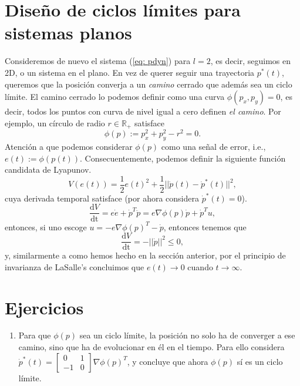 	\section{Diseño de ciclos límites para sistemas planos}
	Consideremos de nuevo el sistema (\ref{eq: pdyn}) para $l=2$, es decir, seguimos en 2D, o un sistema en el plano. En vez de querer seguir una trayectoria $p^*(t)$, queremos que la posición converja a un \emph{camino} cerrado que además sea un ciclo límite. El camino cerrado lo podemos definir como una curva $\phi(p_x, p_y) = 0$, es decir, todos los puntos con curva de nivel igual a cero definen \emph{el camino}. Por ejemplo, un círculo de radio $r\in\mathbb{R}_+$ 
 satisface
	\begin{equation}
	\phi(p) := p_x^2 + p_y^2 - r^2 = 0.
	\end{equation}
Atención a que podemos considerar $\phi(p)$ como una señal de error, i.e., $e(t) := \phi(p(t))$. Consecuentemente, podemos definir la siguiente función candidata de Lyapunov.
\begin{equation}
	V(e(t)) = \frac{1}{2}e(t)^2 + \frac{1}{2}||\dot p(t) - \dot p^*(t)||^2,
	\label{eq: Ve2}
\end{equation}
	cuya derivada temporal satisface (por ahora considera $\dot p^*(t) = 0$).
	\begin{equation}
		\frac{\mathrm{d}V}{\mathrm{dt}} = e\dot e + \dot p^T\ddot p = e \nabla\phi(p) \dot p + \dot p^T u,
	\end{equation}
	entonces, si uno escoge $u = -e \nabla\phi(p)^T -\dot p$, entonces tenemos que
	\begin{equation}
\frac{\mathrm{d}V}{\mathrm{dt}} = -||\dot p||^2 \leq 0,
	\end{equation}
y, similarmente a como hemos hecho en la sección anterior, por el principio de invarianza de LaSalle's concluimos que $e(t) \to 0$ cuando $t\to\infty$.

\section*{Ejercicios}
\begin{enumerate}
\item Para que $\phi(p)$ sea un ciclo límite, la posición no solo ha de converger a ese camino, sino que ha de evolucionar en él en el tiempo. Para ello considera $\dot p^*(t) = \begin{bmatrix}0 & 1 \\ -1 & 0\end{bmatrix}\nabla\phi(p)^T$, y concluye que ahora $\phi(p)$ sí es un ciclo límite.
\end{enumerate}

